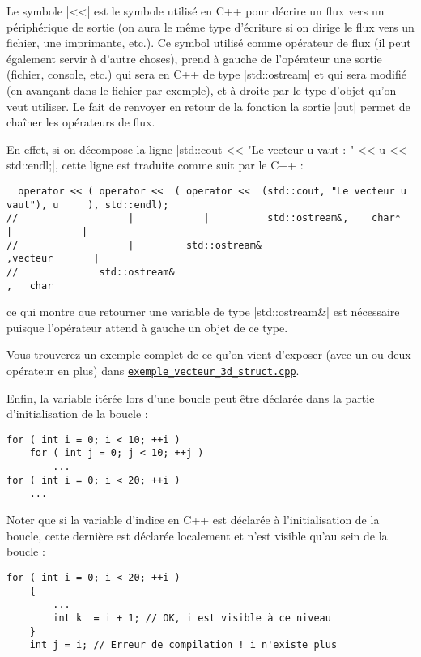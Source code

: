 Le symbole |<<| est le symbole utilisé en C++ pour décrire un flux vers un périphérique de sortie (on aura le même type
d'écriture si on dirige le flux vers un fichier, une imprimante, etc.). Ce symbol utilisé comme opérateur de flux (il peut
également servir à d'autre choses), prend à gauche de l'opérateur une sortie (fichier, console, etc.) qui sera en C++
de type |std::ostream| et qui sera modifié (en avançant dans le fichier par exemple), et à droite par le type d'objet qu'on
veut utiliser. Le fait de renvoyer en retour de la fonction la sortie |out| permet de chaîner les opérateurs de flux.

En effet, si on décompose la ligne |std::cout << "Le vecteur u vaut : " << u << std::endl;|, cette ligne est traduite
comme suit par le C++ :
\begin{lstlisting}
  operator << ( operator <<  ( operator <<  (std::cout, "Le vecteur u vaut"), u     ), std::endl);
//                   |            |          std::ostream&,    char*          |            |
//                   |         std::ostream&                                ,vecteur       |
//              std::ostream&                                                        ,   char
\end{lstlisting}

ce qui montre que retourner une variable de type |std::ostream&| est nécessaire puisque l'opérateur attend à gauche un objet de ce type.

Vous trouverez un exemple complet de ce qu'on vient d'exposer (avec un ou deux opérateur en plus) dans 
\href{run:./Exemples/exemple_vecteur_3d_struct.cpp}{\texttt{exemple\_vecteur\_3d\_struct.cpp}}.


Enfin, la variable itérée lors d'une boucle peut être déclarée dans la partie d'initialisation de la boucle :
\begin{lstlisting}[caption=Initialisation d'une boucle]
for ( int i = 0; i < 10; ++i )
    for ( int j = 0; j < 10; ++j )
        ...
for ( int i = 0; i < 20; ++i )
    ...
\end{lstlisting}

Noter que si la variable d'indice en C++ est déclarée à l'initialisation de la boucle, cette dernière est déclarée localement et n'est visible qu'au sein de la boucle :

\begin{lstlisting}[caption=localité de l'indice de boucle en C++]
    for ( int i = 0; i < 20; ++i )
    {
        ...
        int k  = i + 1; // OK, i est visible à ce niveau
    }
    int j = i; // Erreur de compilation ! i n'existe plus
\end{lstlisting}

